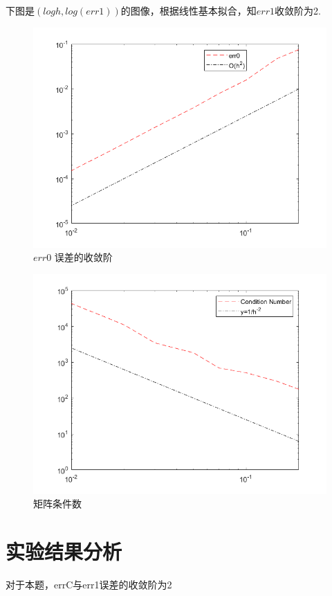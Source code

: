 \documentclass{article}
\begin{document}
\newpage
下图是$(logh,log(err1))$的图像，根据线性基本拟合，知$err1$收敛阶为2.
\begin{figure}[H]
\centering
\includegraphics[scale=0.5]{err0.png}
\caption{\label{err0}$err0$ 误差的收敛阶}
\end{figure}

\begin{figure}[H]
	\centering
	\includegraphics[scale=0.5]{CondN.png}
	\caption{\label{CondN}矩阵条件数}
\end{figure}


\section{实验结果分析}
对于本题，errC与err1误差的收敛阶为2
\end{document}
